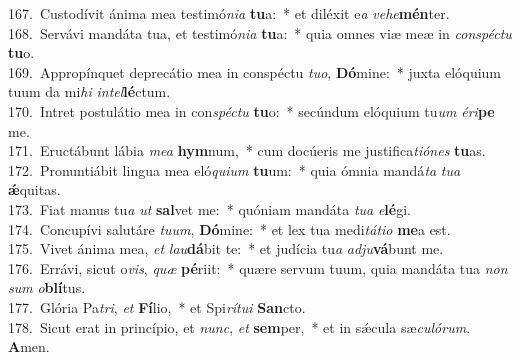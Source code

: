 {167.~}Custodívit ánima mea testimó\textit{ni}\textit{a} \textbf{tu}a:~* et diléxit e\textit{a} \textit{ve}\textit{he}\textbf{mén}ter.\\
{168.~}Servávi mandáta tua, et testimó\textit{ni}\textit{a} \textbf{tu}a:~* quia omnes viæ meæ in \textit{con}\textit{spé}\textit{ctu} \textbf{tu}o.\\
{169.~}Appropínquet deprecátio mea in conspéctu \textit{tu}\textit{o}, \textbf{Dó}mine:~* juxta elóquium tuum da mi\textit{hi} \textit{in}\textit{tel}\textbf{lé}ctum.\\
{170.~}Intret postulátio mea in con\textit{spé}\textit{ctu} \textbf{tu}o:~* secúndum elóquium tu\textit{um} \textit{é}\textit{ri}\textbf{pe} me.\\
{171.~}Eructábunt lábia \textit{me}\textit{a} \textbf{hym}num,~* cum docúeris me justifica\textit{ti}\textit{ó}\textit{nes} \textbf{tu}as.\\
{172.~}Pronuntiábit lingua mea eló\textit{qui}\textit{um} \textbf{tu}um:~* quia ómnia mandá\textit{ta} \textit{tu}\textit{a} \textbf{ǽ}quitas.\\
{173.~}Fiat manus tu\textit{a} \textit{ut} \textbf{sal}vet me:~* quóniam mandáta \textit{tu}\textit{a} \textit{e}\textbf{lé}gi.\\
{174.~}Concupívi salutáre \textit{tu}\textit{um}, \textbf{Dó}mine:~* et lex tua medi\textit{tá}\textit{ti}\textit{o} \textbf{me}a est.\\
{175.~}Vivet ánima mea, \textit{et} \textit{lau}\textbf{dá}bit te:~* et judícia tu\textit{a} \textit{ad}\textit{ju}\textbf{vá}bunt me.\\
{176.~}Errávi, sicut o\textit{vis}, \textit{quæ} \textbf{pé}riit:~* quære servum tuum, quia mandáta tua \textit{non} \textit{sum} \textit{o}\textbf{blí}tus.\\
{177.~}Glória Pa\textit{tri}, \textit{et} \textbf{Fí}lio,~* et Spi\textit{rí}\textit{tu}\textit{i} \textbf{San}cto.\\
{178.~}Sicut erat in princípio, et \textit{nunc}, \textit{et} \textbf{sem}per,~* et in sǽcula sæ\textit{cu}\textit{ló}\textit{rum}. \textbf{A}men.\\
